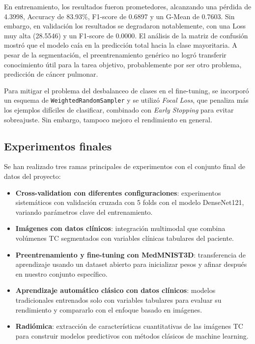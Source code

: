 En entrenamiento, los resultados fueron prometedores, alcanzando una pérdida de 4.3998, Accuracy de 83.93\%, F1-score de 0.6897 y un G-Mean de 0.7603. Sin embargo, en validación los resultados se degradaron notablemente, con una Loss muy alta (28.5546) y un F1-score de 0.0000. El análisis de la matriz de confusión mostró que el modelo caía en la predicción total hacia la clase mayoritaria. A pesar de la segmentación, el preentrenamiento genérico no logró transferir conocimiento útil para la tarea objetivo, probablemente por ser otro problema, predicción de cáncer pulmonar.

Para mitigar el problema del desbalanceo de clases en el fine-tuning, se incorporó un esquema de \texttt{WeightedRandomSampler} y se utilizó \textit{Focal Loss}, que penaliza más los ejemplos difíciles de clasificar, combinado con \textit{Early Stopping} para evitar sobreajuste. Sin embargo, tampoco mejoro el rendimiento en general. 

\subsection{Experimentos finales}

Se han realizado tres ramas principales de experimentos con el conjunto final de datos del proyecto:

\begin{itemize}
    \item \textbf{Cross-validation con diferentes configuraciones}: experimentos sistemáticos con validación cruzada con 5 folds con el modelo DenseNet121, variando parámetros clave del entrenamiento.
    \item \textbf{Imágenes con datos clínicos}: integración multimodal que combina volúmenes TC segmentados con variables clínicas tabulares del paciente.
    \item \textbf{Preentrenamiento y fine-tuning con MedMNIST3D}: transferencia de aprendizaje usando un dataset abierto para inicializar pesos y afinar después en nuestro conjunto específico.
    \item \textbf{Aprendizaje automático clásico con datos clínicos}: modelos tradicionales entrenados solo con variables tabulares para evaluar su rendimiento y compararlo con el enfoque basado en imágenes.
    \item \textbf{Radiómica}: extracción de características cuantitativas de las imágenes TC para construir modelos predictivos con métodos clásicos de machine learning.
\end{itemize}


